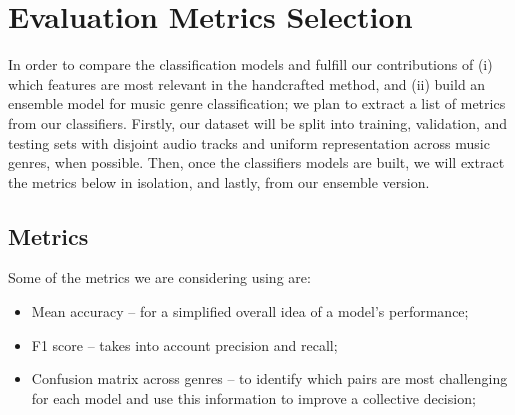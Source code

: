 \section{Evaluation Metrics Selection}

In order to compare the classification models and fulfill our contributions of (i) which features are most relevant in the handcrafted method, and (ii) build an ensemble model for music genre classification; we plan to extract a list of metrics from our classifiers. Firstly, our dataset will be split into training, validation, and testing sets with disjoint audio tracks and uniform representation across music genres, when possible. Then, once the classifiers models are built, we will extract the metrics below in isolation, and lastly, from our ensemble version.

\subsection{Metrics}

Some of the metrics we are considering using are:

\begin{itemize}
    \item Mean accuracy -- for a simplified overall idea of a model's performance;
    \item F1 score -- takes into account precision and recall;
    \item Confusion matrix across genres -- to identify which pairs are most challenging for each model and use this information to improve a collective decision;
\end{itemize}
